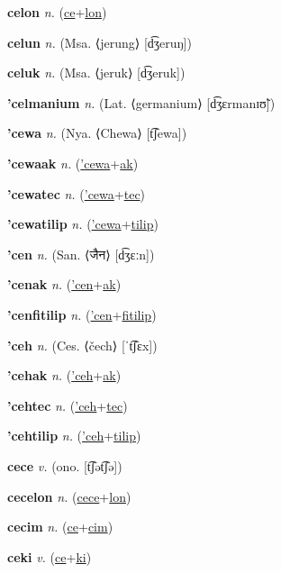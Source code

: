 \textbf{\hypertarget{celon}{celon}} \textit{n.} (\hyperlink{ce}{ce}+\allowbreak \hyperlink{lon}{lon})


\textbf{\hypertarget{celun}{celun}} \textit{n.} (Msa. ⟨jerung⟩ [d͡ʒeruŋ])


\textbf{\hypertarget{celuk}{celuk}} \textit{n.} (Msa. ⟨jeruk⟩ [d͡ʒeruk])


\textbf{\hypertarget{'celmanium}{'celmanium}} \textit{n.} (Lat. ⟨germanium⟩ [d͡ʒɛrmanɪʊ̃])


\textbf{\hypertarget{'cewa}{'cewa}} \textit{n.} (Nya. ⟨Chewa⟩ [t͡ʃewa])


\textbf{\hypertarget{'cewaak}{'cewaak}} \textit{n.} (\hyperlink{'cewa}{'cewa}+\allowbreak \hyperlink{ak}{ak})


\textbf{\hypertarget{'cewatec}{'cewatec}} \textit{n.} (\hyperlink{'cewa}{'cewa}+\allowbreak \hyperlink{tec}{tec})


\textbf{\hypertarget{'cewatilip}{'cewatilip}} \textit{n.} (\hyperlink{'cewa}{'cewa}+\allowbreak \hyperlink{tilip}{tilip})


\textbf{\hypertarget{'cen}{'cen}} \textit{n.} (San. ⟨{\devanagari{}जैन}⟩ [d͡ʒɛːn])


\textbf{\hypertarget{'cenak}{'cenak}} \textit{n.} (\hyperlink{'cen}{'cen}+\allowbreak \hyperlink{ak}{ak})


\textbf{\hypertarget{'cenfitilip}{'cenfitilip}} \textit{n.} (\hyperlink{'cen}{'cen}+\allowbreak \hyperlink{fitilip}{fitilip})


\textbf{\hypertarget{'ceh}{'ceh}} \textit{n.} (Ces. ⟨čech⟩ [ˈt͡ʃɛx])


\textbf{\hypertarget{'cehak}{'cehak}} \textit{n.} (\hyperlink{'ceh}{'ceh}+\allowbreak \hyperlink{ak}{ak})


\textbf{\hypertarget{'cehtec}{'cehtec}} \textit{n.} (\hyperlink{'ceh}{'ceh}+\allowbreak \hyperlink{tec}{tec})


\textbf{\hypertarget{'cehtilip}{'cehtilip}} \textit{n.} (\hyperlink{'ceh}{'ceh}+\allowbreak \hyperlink{tilip}{tilip})


\textbf{\hypertarget{cece}{cece}} \textit{v.} (ono. [t͡ʃət͡ʃə])


\textbf{\hypertarget{cecelon}{cecelon}} \textit{n.} (\hyperlink{cece}{cece}+\allowbreak \hyperlink{lon}{lon})


\textbf{\hypertarget{cecim}{cecim}} \textit{n.} (\hyperlink{ce}{ce}+\allowbreak \hyperlink{cim}{cim})


\textbf{\hypertarget{ceki}{ceki}} \textit{v.} (\hyperlink{ce}{ce}+\allowbreak \hyperlink{ki}{ki})


